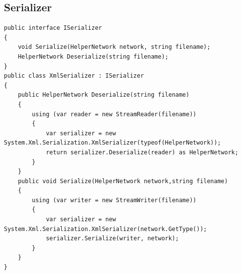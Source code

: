 \documentclass[12pt,a4paper]{article}
\begin{document}
	\subsection{Serializer}
	\begin{lstlisting}
public interface ISerializer
{
    void Serialize(HelperNetwork network, string filename);
    HelperNetwork Deserialize(string filename);
}
public class XmlSerializer : ISerializer
{
    public HelperNetwork Deserialize(string filename)
    {
        using (var reader = new StreamReader(filename))
        {
            var serializer = new System.Xml.Serialization.XmlSerializer(typeof(HelperNetwork));
            return serializer.Deserialize(reader) as HelperNetwork;
        }
    }
    public void Serialize(HelperNetwork network,string filename)
    {
        using (var writer = new StreamWriter(filename))
        {
            var serializer = new System.Xml.Serialization.XmlSerializer(network.GetType());
            serializer.Serialize(writer, network);
        }
    }
}
	\end{lstlisting}
	\clearpage
\end{document}
